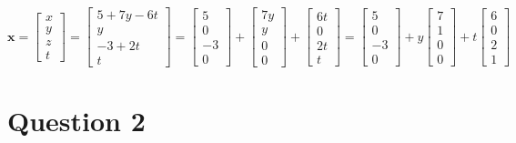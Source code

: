 \documentclass{report}
\begin{document}
\begin{equation}
\mathbf{x}
=
\begin{bmatrix}
x \\ 
y \\ 
z \\
t
\end{bmatrix}
=
\begin{bmatrix}
5+7y-6t \\ 
y \\ 
-3+2t \\
t
\end{bmatrix}
=
\begin{bmatrix}
5 \\ 
0 \\ 
-3 \\
0
\end{bmatrix}
+
\begin{bmatrix}
7y \\ 
y \\ 
0 \\
0
\end{bmatrix}
+
\begin{bmatrix}
6t \\ 
0 \\ 
2t \\
t
\end{bmatrix}
=
\begin{bmatrix}
5 \\ 
0 \\ 
-3 \\
0
\end{bmatrix}
+
y
\begin{bmatrix}
7 \\ 
1 \\ 
0 \\
0
\end{bmatrix}
+
t
\begin{bmatrix}
6 \\ 
0 \\ 
2 \\
1
\end{bmatrix}
\end{equation}

\clearpage
\section*{Question 2}
\end{document}
